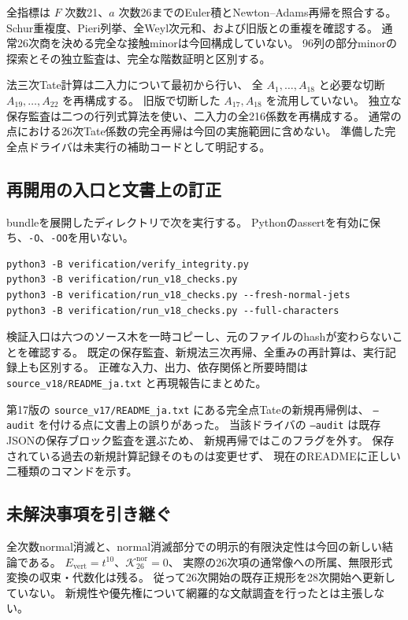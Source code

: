 \documentclass[a4paper,11pt]{ltjsarticle}
\theoremstyle{definition}
\begin{document}
全指標は $F$ 次数21、$a$ 次数26までのEuler積とNewton--Adams再帰を照合する。
Schur重複度、Pieri列挙、全Weyl次元和、および旧版との重複を確認する。
通常26次商を決める完全な接触minorは今回構成していない。
96列の部分minorの探索とその独立監査は、完全な階数証明と区別する。

法三次Tate計算は二入力について最初から行い、
全 $A_1,\ldots,A_{18}$ と必要な切断 $A_{19},\ldots,A_{22}$ を再構成する。
旧版で切断した $A_{17},A_{18}$ を流用していない。
独立な保存監査は二つの行列式算法を使い、二入力の全216係数を再構成する。
通常の点における26次Tate係数の完全再帰は今回の実施範囲に含めない。
準備した完全点ドライバは未実行の補助コードとして明記する。

\subsection{再開用の入口と文書上の訂正}

bundleを展開したディレクトリで次を実行する。
Pythonのassertを有効に保ち、\texttt{-O}、\texttt{-OO}を用いない。
\begin{verbatim}
python3 -B verification/verify_integrity.py
python3 -B verification/run_v18_checks.py
python3 -B verification/run_v18_checks.py --fresh-normal-jets
python3 -B verification/run_v18_checks.py --full-characters
\end{verbatim}
検証入口は六つのソース木を一時コピーし、元のファイルのhashが変わらないことを確認する。
既定の保存監査、新規法三次再帰、全重みの再計算は、実行記録上も区別する。
正確な入力、出力、依存関係と所要時間は
\nolinkurl{source_v18/README_ja.txt} と再現報告にまとめた。

第17版の \nolinkurl{source_v17/README_ja.txt} にある完全点Tateの新規再帰例は、
\texttt{--audit} を付ける点に文書上の誤りがあった。
当該ドライバの \texttt{--audit} は既存JSONの保存ブロック監査を選ぶため、
新規再帰ではこのフラグを外す。
保存されている過去の新規計算記録そのものは変更せず、
現在のREADMEに正しい二種類のコマンドを示す。

\subsection{未解決事項を引き継ぐ}

全次数normal消滅と、normal消滅部分での明示的有限決定性は今回の新しい結論である。
$E_{\mathrm{vert}}=t^{10}$、$\mathcal K_{26}^{\mathrm{nor}}=0$、
実際の26次項の通常像への所属、無限形式変換の収束・代数化は残る。
従って26次開始の既存正規形を28次開始へ更新していない。
新規性や優先権について網羅的な文献調査を行ったとは主張しない。
\end{document}
